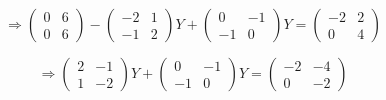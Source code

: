 \documentclass[a4paper,12pt]{article}
\begin{document}
\begin{ejercicio}[title=Ejercicio 24]
\[
\Rightarrow
\begin{pmatrix}
0 & 6\\
0 & 6
\end{pmatrix}
-
\begin{pmatrix}
-2 & 1\\
-1 & 2
\end{pmatrix} Y
+
\begin{pmatrix}
0 & -1\\
-1 & 0
\end{pmatrix} Y
=
\begin{pmatrix}
-2 & 2\\
0 & 4
\end{pmatrix}
\]

\[
\Rightarrow
\begin{pmatrix}
2 & -1\\
1 & -2
\end{pmatrix} Y
+
\begin{pmatrix}
0 & -1\\
-1 & 0
\end{pmatrix} Y
=
\begin{pmatrix}
-2 & -4\\
0 & -2
\end{pmatrix}
\]


\end{ejercicio}
\end{document}
